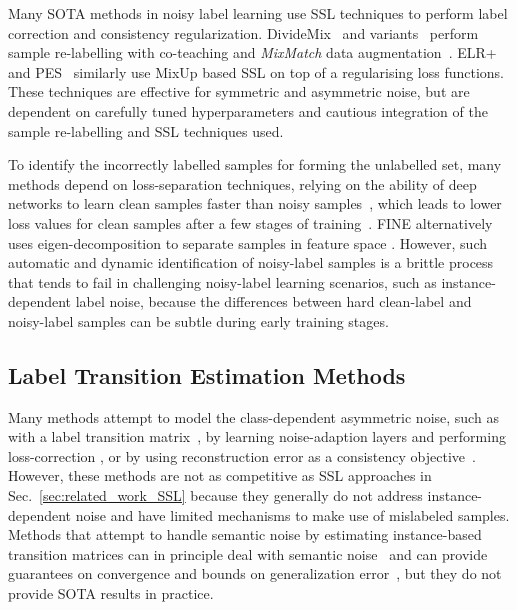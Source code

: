 \documentclass[10pt,twocolumn,letterpaper]{article}
\begin{document}
Many SOTA methods in noisy label learning use SSL techniques to perform label correction and consistency regularization. DivideMix~\cite{li2020dividemix} and variants~\cite{sachdeva2021scanmix, cordeiro2021propmix, zheltonozhskii2022contrast} perform sample re-labelling with co-teaching and \textit{MixMatch} data augmentation~\cite{berthelot2019mixmatch}. 
ELR+~\cite{liu2020early} and PES~\cite{bai2021understanding} similarly use MixUp \cite{zhang2018mixup} based SSL on top of a regularising loss functions. 
These techniques are effective for symmetric and asymmetric noise, but are dependent on carefully tuned hyperparameters 
and cautious integration of the sample re-labelling and SSL techniques used.

To identify the incorrectly labelled samples for forming the unlabelled set, many methods depend on loss-separation techniques, relying on the ability of deep networks to learn clean samples faster than noisy samples~\cite{arpit2017closer}, which leads to lower loss values for clean samples after a few stages of  training~\cite{han2018co, chen2019understanding, arazo2019unsupervised, li2020dividemix, xu2021faster}. FINE alternatively uses eigen-decomposition to separate samples in feature space \cite{kim2021fine}.  
However, such automatic and dynamic identification of noisy-label samples is a brittle process that tends to fail in challenging noisy-label learning scenarios, such as instance-dependent label noise, because the differences between hard clean-label and noisy-label samples can be subtle during early training stages.

\subsection{Label Transition Estimation Methods}

Many methods attempt to model the class-dependent asymmetric noise, such as with a label transition matrix~\cite{xia2019anchor}, by learning
noise-adaption layers and performing loss-correction \cite{Goldberger2017TrainingDN, patrini2017making},
or by using reconstruction error as a consistency objective~\cite{reed2014training}. However, these methods are not as  competitive as SSL approaches in Sec.~\ref{sec:related_work_SSL} because they generally do not address instance-dependent noise and have 
limited mechanisms to make use of mislabeled samples.
Methods that attempt to handle semantic noise by estimating instance-based transition matrices can in principle deal with semantic noise~\cite{Goldberger2017TrainingDN} and can provide guarantees on convergence and bounds on generalization error~\cite{zhang2021learning}, but they do not provide SOTA results in practice.
\end{document}
